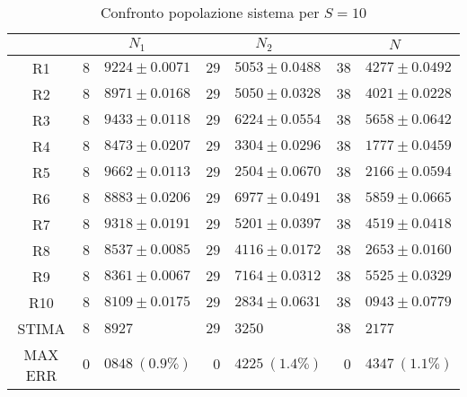 \begin{table}[!h]
\begin{tabular}{c|r@{.}l|r@{.}l|r@{.}l}
& \multicolumn{2}{|c|}{$N_1$}
& \multicolumn{2}{|c|}{$N_2$}
& \multicolumn{2}{|c}{$N$} 
\\          
\hline
R1      & $8$&$9224 \pm 0.0071$ & $29$&$5053 \pm 0.0488$ & $38$&$4277 \pm 0.0492$ \\
R2      & $8$&$8971 \pm 0.0168$ & $29$&$5050 \pm 0.0328$ & $38$&$4021 \pm 0.0228$ \\
R3      & $8$&$9433 \pm 0.0118$ & $29$&$6224 \pm 0.0554$ & $38$&$5658 \pm 0.0642$ \\
R4      & $8$&$8473 \pm 0.0207$ & $29$&$3304 \pm 0.0296$ & $38$&$1777 \pm 0.0459$ \\
R5      & $8$&$9662 \pm 0.0113$ & $29$&$2504 \pm 0.0670$ & $38$&$2166 \pm 0.0594$ \\
R6      & $8$&$8883 \pm 0.0206$ & $29$&$6977 \pm 0.0491$ & $38$&$5859 \pm 0.0665$ \\
R7      & $8$&$9318 \pm 0.0191$ & $29$&$5201 \pm 0.0397$ & $38$&$4519 \pm 0.0418$ \\
R8      & $8$&$8537 \pm 0.0085$ & $29$&$4116 \pm 0.0172$ & $38$&$2653 \pm 0.0160$ \\
R9      & $8$&$8361 \pm 0.0067$ & $29$&$7164 \pm 0.0312$ & $38$&$5525 \pm 0.0329$ \\
R10     & $8$&$8109 \pm 0.0175$ & $29$&$2834 \pm 0.0631$ & $38$&$0943 \pm 0.0779$ \\
STIMA   & $8$&$8927$            & $29$&$3250$            & $38$&$2177$            \\
MAX ERR & $0$&$0848 \ (0.9\%)$  & $0$&$4225 \ (1.4\%)$   & $0$&$4347 \ (1.1\%)$     
\end{tabular}
\centering
\caption{Confronto popolazione sistema per $S=10$}
\label{tab:10_n}
\end{table}
